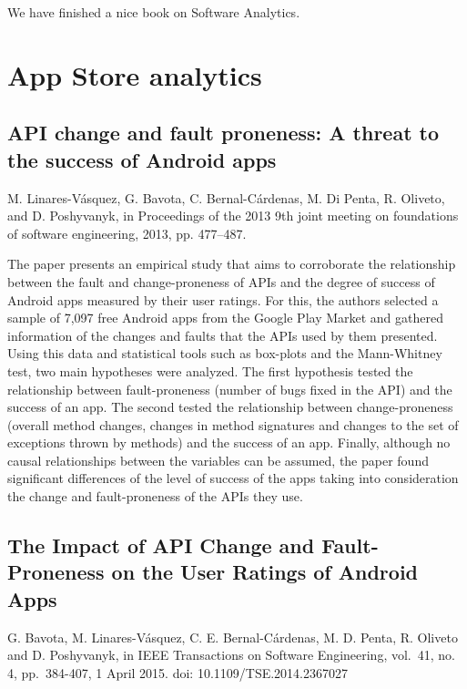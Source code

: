 \documentclass[]{book}
\begin{document}
We have finished a nice book on Software Analytics.

\chapter{App Store analytics}\label{app-store-analytics}

\section{API change and fault proneness: A threat to the success of
Android
apps}\label{api-change-and-fault-proneness-a-threat-to-the-success-of-android-apps}

M. Linares-Vásquez, G. Bavota, C. Bernal-Cárdenas, M. Di Penta, R.
Oliveto, and D. Poshyvanyk, in Proceedings of the 2013 9th joint meeting
on foundations of software engineering, 2013, pp. 477--487.

The paper presents an empirical study that aims to corroborate the
relationship between the fault and change-proneness of APIs and the
degree of success of Android apps measured by their user ratings. For
this, the authors selected a sample of 7,097 free Android apps from the
Google Play Market and gathered information of the changes and faults
that the APIs used by them presented. Using this data and statistical
tools such as box-plots and the Mann-Whitney test, two main hypotheses
were analyzed. The first hypothesis tested the relationship between
fault-proneness (number of bugs fixed in the API) and the success of an
app. The second tested the relationship between change-proneness
(overall method changes, changes in method signatures and changes to the
set of exceptions thrown by methods) and the success of an app. Finally,
although no causal relationships between the variables can be assumed,
the paper found significant differences of the level of success of the
apps taking into consideration the change and fault-proneness of the
APIs they use.

\section{The Impact of API Change and Fault-Proneness on the User
Ratings of Android
Apps}\label{the-impact-of-api-change-and-fault-proneness-on-the-user-ratings-of-android-apps}

G. Bavota, M. Linares-Vásquez, C. E. Bernal-Cárdenas, M. D. Penta, R.
Oliveto and D. Poshyvanyk, in IEEE Transactions on Software Engineering,
vol.~41, no. 4, pp.~384-407, 1 April 2015. doi: 10.1109/TSE.2014.2367027
\end{document}
